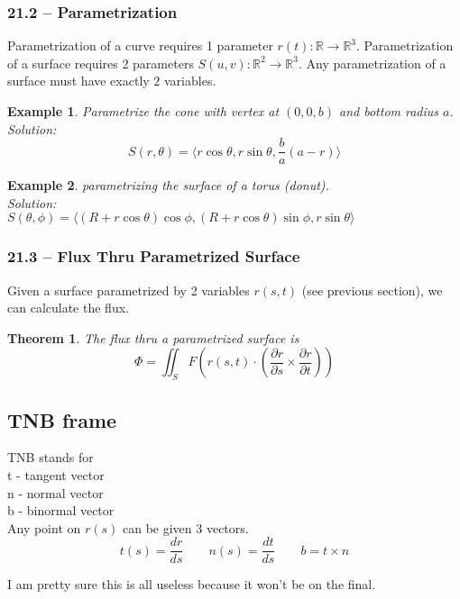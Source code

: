 \documentclass[11pt]{article}
\newtheorem{thm}{Theorem}
\newtheorem{ex}{Example}
\begin{document}
              \subsubsection{21.2 -- Parametrization}
              Parametrization of a curve requires 1 parameter $r(t) : \mathbb{R} \to \mathbb{R}^{3}$.
              Parametrization of a surface requires 2 parameters $S(u,v) : \mathbb{R}^{2} \to \mathbb{R}^{3}$. Any
              parametrization of a surface must have exactly $2$ variables.
              \begin{ex}
                Parametrize the cone with vertex at $(0,0,b)$ and bottom radius $a$. \\
                Solution: \\

                \[S(r, \theta) = \langle r\cos\theta, r\sin\theta,  \frac{b}{a}(a-r)\rangle\]
                \end{ex}
                \begin{ex}
                  parametrizing the surface of a torus (donut). \\
                  Solution: \\
                  $S(\theta, \phi) = \langle (R + r\cos\theta)\cos\phi , (R + r \cos\theta)\sin\phi, r\sin\theta\rangle$
                  \end{ex}

                  \subsubsection{21.3 -- Flux Thru Parametrized Surface}
                  Given a surface parametrized by 2 variables $r(s,t)$  (see previous section), we
                  can calculate the flux.
                  \begin{thm}
                    The flux thru a parametrized surface is
                    \[\Phi = \iint_{S} F(r(s,t)  \cdot (\frac{\partial r}{\partial s} \times \frac{\partial r}{\partial t}))\]
                    \end{thm}
                    \subsection{TNB frame}
                    TNB stands for \\
                    t - tangent vector \\
                    n - normal vector \\
                    b - binormal vector \\
                    Any point on $r(s)$ can be given 3 vectors.
                    \[t(s) = \frac{dr}{ds} \qquad n(s) = \frac{dt}{ds} \qquad b = t \times n\]

                    I am pretty sure this is all useless because it won't be on the final.
\end{document}
